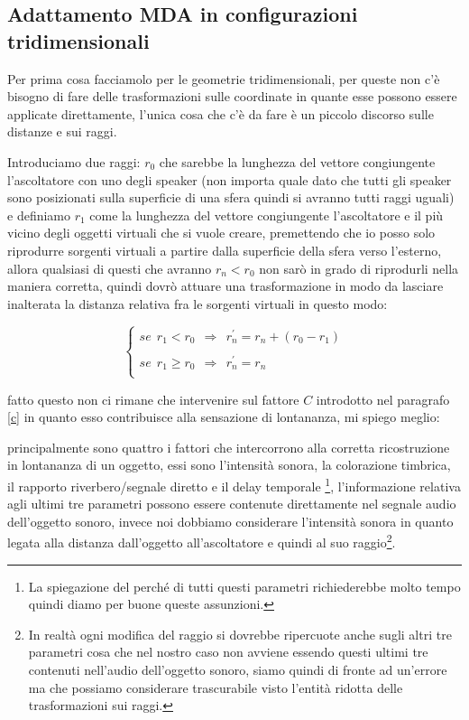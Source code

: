 \documentclass[12pt,a4paper]{report}
\begin{document}
\begin{itemize}
\subsection{Adattamento MDA in configurazioni tridimensionali}

Per prima cosa facciamolo per le geometrie tridimensionali, per queste non c'è bisogno di fare delle trasformazioni sulle coordinate in quante esse possono essere applicate direttamente, l'unica cosa che c'è da fare è un piccolo discorso sulle distanze e sui raggi.

Introduciamo due raggi: $r_0$ che sarebbe la lunghezza del vettore congiungente l'ascoltatore con uno degli speaker (non importa quale dato che tutti gli speaker sono posizionati sulla superficie di una sfera quindi si avranno tutti raggi uguali) e definiamo $r_1$ come la lunghezza del vettore congiungente l'ascoltatore e il più vicino degli oggetti virtuali che si vuole creare, premettendo che io posso solo riprodurre sorgenti virtuali a partire dalla superficie della sfera verso l'esterno, allora qualsiasi di questi che avranno $r_n < r_0$ non sarò in grado di riprodurli nella maniera corretta, quindi dovrò attuare una trasformazione in modo da lasciare inalterata la distanza relativa fra le sorgenti virtuali in questo modo:

\begin{equation}
\left\{\begin{matrix}
se\ \  r_1 < r_0\ \ \Rightarrow \ \ r_n^{\prime} = r_n+(r_0 - r_1) \\
\\
se\ \  r_1 \geq r_0\ \ \Rightarrow \ \ r_n^{\prime} = r_n\\
\end{matrix}\right.
\label{jjjj}
\end{equation}

fatto questo non ci rimane che intervenire sul fattore $C$ introdotto nel paragrafo \ref{c} in quanto esso contribuisce alla sensazione di lontananza, mi spiego meglio:

principalmente sono quattro i fattori che intercorrono alla corretta ricostruzione in lontananza di un oggetto, essi sono l'intensità sonora, la colorazione timbrica, il rapporto riverbero/segnale diretto e il delay temporale \footnote{La spiegazione del perché di tutti questi parametri richiederebbe molto tempo quindi diamo per buone queste assunzioni.}, l'informazione relativa agli ultimi tre parametri possono essere contenute direttamente nel segnale audio dell'oggetto sonoro, invece noi dobbiamo considerare l'intensità sonora in quanto legata alla distanza dall'oggetto all'ascoltatore e quindi al suo raggio\footnote{In realtà ogni modifica del raggio si dovrebbe ripercuote anche sugli altri tre parametri cosa che nel nostro caso non avviene essendo questi ultimi tre contenuti nell'audio dell'oggetto sonoro, siamo quindi di fronte ad un'errore ma che possiamo considerare trascurabile visto l'entità ridotta delle trasformazioni sui raggi.}.


\end{itemize}
\end{document}
